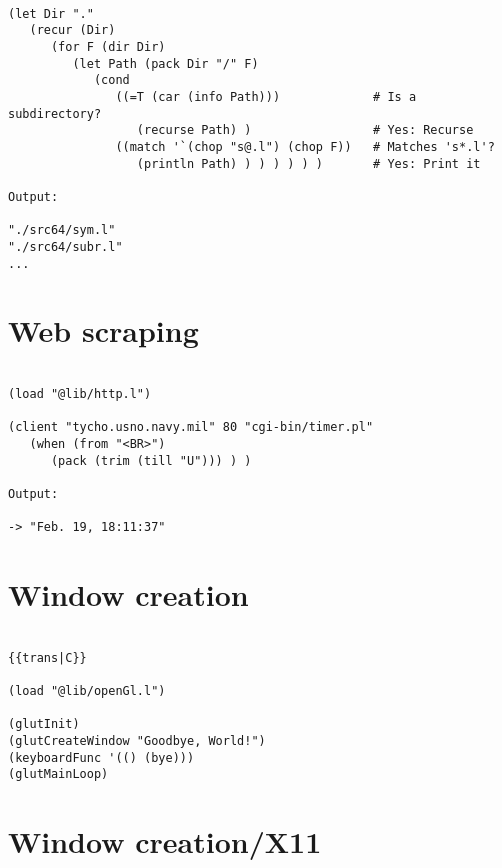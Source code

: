 \begin{verbatim}

(let Dir "."
   (recur (Dir)
      (for F (dir Dir)
         (let Path (pack Dir "/" F)
            (cond
               ((=T (car (info Path)))             # Is a subdirectory?
                  (recurse Path) )                 # Yes: Recurse
               ((match '`(chop "s@.l") (chop F))   # Matches 's*.l'?
                  (println Path) ) ) ) ) ) )       # Yes: Print it

Output:

"./src64/sym.l"
"./src64/subr.l"
...

\end{verbatim}

\section*{Web scraping}

\begin{verbatim}

(load "@lib/http.l")

(client "tycho.usno.navy.mil" 80 "cgi-bin/timer.pl"
   (when (from "<BR>")
      (pack (trim (till "U"))) ) )

Output:

-> "Feb. 19, 18:11:37"

\end{verbatim}

\section*{Window creation}

\begin{verbatim}

{{trans|C}}

(load "@lib/openGl.l")

(glutInit)
(glutCreateWindow "Goodbye, World!")
(keyboardFunc '(() (bye)))
(glutMainLoop)

\end{verbatim}

\section*{Window creation/X11}

